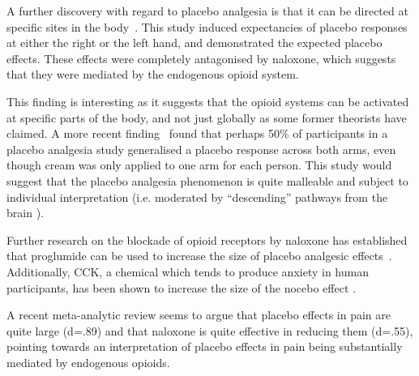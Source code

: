 A further discovery with regard to placebo analgesia is that it can be directed at specific sites in the body~\cite{Benedetti1999}. This study induced expectancies of placebo responses at either the right or the left hand, and demonstrated the expected placebo effects. These effects were completely antagonised by naloxone, which suggests that they were mediated by the endogenous opioid system. 

This finding is interesting as it suggests that the opioid systems can be activated at specific parts of the body, and not just globally as some former theorists have claimed. A more recent finding~\cite{Watson2006} found that perhaps 50\% of participants in a placebo analgesia study generalised a placebo response across both arms, even though cream was only applied to one arm for each person. 
This study would suggest that the placebo analgesia phenomenon is quite malleable and subject to individual interpretation (i.e. moderated by ``descending'' pathways from the brain \cite{Goffaux2007}). 

Further research on the blockade of opioid receptors by naloxone has established that proglumide can be used to increase the size of placebo analgesic effects~\cite{Benedetti1995}. Additionally, CCK, a chemical which tends to produce anxiety in human participants, has been shown to increase the size of the nocebo effect \cite{Benedetti1996}. 

A recent meta-analytic review \cite{Sauro2005} seems to argue that placebo effects in pain are quite large (d=.89) and that naloxone is quite effective in reducing them (d=.55), pointing towards an interpretation of placebo effects in pain being substantially mediated by endogenous opioids. 



